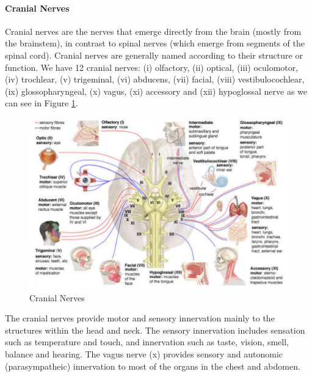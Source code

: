 \documentclass[12pt,article,oneside,a4paper]{memoir}
\begin{document}
\paragraph{Cranial Nerves}
Cranial nerves are the nerves that emerge directly from the brain (mostly from the
brainstem), in contrast to spinal nerves (which emerge from segments of the spinal cord).
Cranial nerves are generally named according to their structure or function. We have 12 cranial nerves: (i) olfactory, (ii) optical, (iii) oculomotor, (iv) trochlear, (v) trigeminal, (vi) abducens, (vii) facial, (viii) vestibulocochlear, (ix) glossopharyngeal, (x) vagus, (xi) accessory and (xii) hypoglossal nerve as we can see in Figure \ref{fig:cranialNerves}.
\begin{figure}
	\centering
  	\includegraphics[width=\linewidth]{imgs/cranialNerves.png}
	\caption{Cranial Nerves}
  	\label{fig:cranialNerves}
\end{figure}

The cranial nerves provide motor and sensory innervation mainly to the structures within the head and neck. The sensory innervation includes sensation such as temperature and touch, and innervation such as taste, vision, smell, balance and hearing. The vagus nerve (x) provides sensory and autonomic (parasympatheic) innervation to most of the organs in the chest and abdomen.
\end{document}
